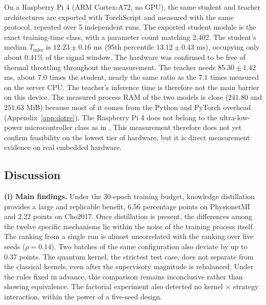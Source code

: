 On a Raspberry Pi 4 (ARM Cortex-A72, no GPU), the same student and
teacher architectures are exported with TorchScript and measured with
the same protocol, repeated over 5 independent runs. The exported
student module is the exact training-time class, with a parameter
count matching 2,402. The student's median $T_{\mathrm{infer}}$ is
$12.23 \pm 0.16$ ms (95th percentile $13.12 \pm 0.43$ ms), occupying only
about $0.41\%$ of the signal window. The hardware was confirmed to be
free of thermal throttling throughout the measurement. The teacher needs
$85.30 \pm 1.42$ ms, about $7.0$ times the student, nearly the same ratio
as the $7.1$ times measured on the server CPU. The teacher's inference
time is therefore not the main barrier on this device. The measured
process RAM of the two models is close ($241.80$ and $251.63$ MiB)
because most of it comes from the Python and PyTorch overhead
(Appendix~\ref{app:dotre}). The Raspberry Pi 4 does not belong to the
ultra-low-power microcontroller class as in \cite{wang2024mibminet}.
This measurement therefore does not yet confirm feasibility on the
lowest tier of hardware, but it is direct measurement evidence on real
embedded hardware.

\subsection{Discussion}
\label{sec:thaoluan}

\textbf{(i) Main findings.} Under the 30-epoch training budget, knowledge
distillation provides a large and replicable benefit, 6.56 percentage points on PhysionetMI and 2.22 points
on Cho2017. Once distillation is present, the differences among the
twelve specific mechanisms lie within the noise of the training process
itself. The ranking from a single run is almost uncorrelated with the
ranking over five seeds ($\rho = 0.14$). Two batches of the same
configuration also deviate by up to 0.37 points. The quantum kernel, the strictest test case, does not separate from the
classical kernels, even after the supervisory magnitude is rebalanced.
Under the rules fixed in advance, this comparison remains inconclusive
rather than showing equivalence. The factorial experiment also detected no
kernel $\times$ strategy interaction, within the power of a five-seed
design.

